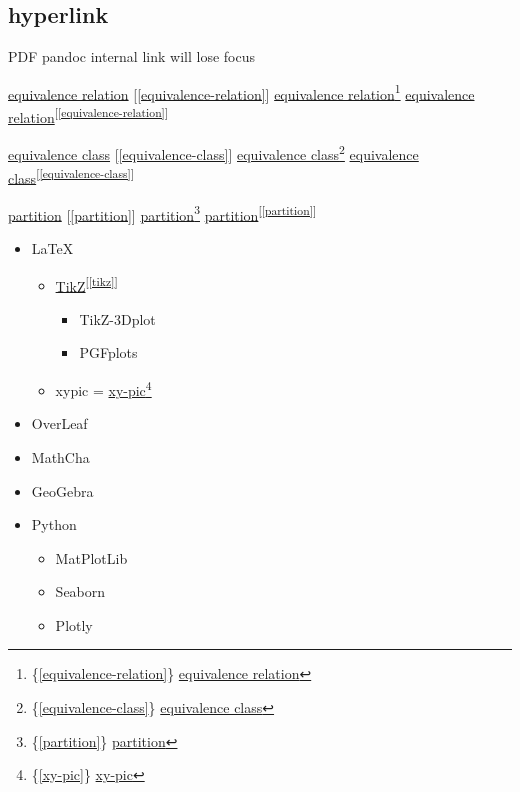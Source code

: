 \documentclass[
]{book}
\providecommand{\tightlist}{%
  \setlength{\itemsep}{0pt}\setlength{\parskip}{0pt}}
\theoremstyle{definition}
\theoremstyle{definition}
\theoremstyle{definition}
\theoremstyle{definition}
\theoremstyle{remark}
\begin{document}
\hypertarget{hyperlink}{%
\subsection{hyperlink}\label{hyperlink}}

PDF pandoc internal link will lose focus

\protect\hyperlink{equivalence-relation}{equivalence relation} {[}\ref{equivalence-relation}{]} \protect\hyperlink{equivalence-relation}{equivalence relation}\footnote{\{\ref{equivalence-relation}\} \protect\hyperlink{equivalence-relation}{equivalence relation}} \protect\hyperlink{equivalence-relation}{equivalence relation}\textsuperscript{{[}\ref{equivalence-relation}{]}}

\protect\hyperlink{equivalence-class}{equivalence class} {[}\ref{equivalence-class}{]} \protect\hyperlink{equivalence-class}{equivalence class}\footnote{\{\ref{equivalence-class}\} \protect\hyperlink{equivalence-class}{equivalence class}} \protect\hyperlink{equivalence-class}{equivalence class}\textsuperscript{{[}\ref{equivalence-class}{]}}

\protect\hyperlink{partition}{partition} {[}\ref{partition}{]} \protect\hyperlink{partition}{partition}\footnote{\{\ref{partition}\} \protect\hyperlink{partition}{partition}} \protect\hyperlink{partition}{partition}\textsuperscript{{[}\ref{partition}{]}}

\begin{itemize}
\tightlist
\item
  LaTeX

  \begin{itemize}
  \tightlist
  \item
    \protect\hyperlink{tikz}{TikZ}\textsuperscript{{[}\ref{tikz}{]}}

    \begin{itemize}
    \tightlist
    \item
      TikZ-3Dplot
    \item
      PGFplots
    \end{itemize}
  \item
    xypic = \protect\hyperlink{xy-pic}{xy-pic}\footnote{\{\ref{xy-pic}\} \protect\hyperlink{xy-pic}{xy-pic}}
  \end{itemize}
\item
  OverLeaf
\item
  MathCha
\item
  GeoGebra
\item
  Python

  \begin{itemize}
  \tightlist
  \item
    MatPlotLib
  \item
    Seaborn
  \item
    Plotly
  \end{itemize}
\end{itemize}
\end{document}
